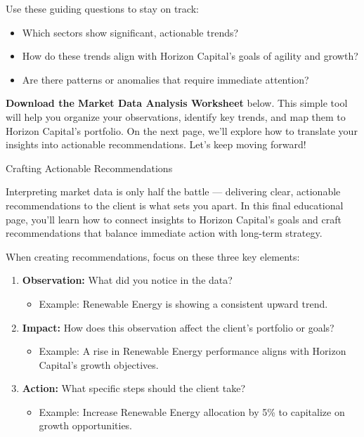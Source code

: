 \documentclass[11pt]{article}
\begin{document}
Use these guiding questions to stay on track:
\begin{itemize}[leftmargin=1.5em, itemsep=2pt]
  \item Which sectors show significant, actionable trends?
  \item How do these trends align with Horizon Capital's goals of agility and
  growth?
  \item Are there patterns or anomalies that require immediate attention?
\end{itemize}


\textbf{Download the Market Data Analysis Worksheet} below. This simple tool
will help you organize your observations, identify key trends, and map them to
Horizon Capital's portfolio. On the next page, we'll explore how to translate
your insights into actionable recommendations. Let's keep moving forward!\par\medskip


\newpage
{\fontsize{26}{30}\selectfont Crafting Actionable Recommendations}\par\bigskip

Interpreting market data is only half the battle --- delivering clear,
actionable recommendations to the client is what sets you apart. In this final
educational page, you'll learn how to connect insights to Horizon Capital's
goals and craft recommendations that balance immediate action with long-term
strategy.

When creating recommendations, focus on these three key elements:
\begin{enumerate}[leftmargin=1.5em, itemsep=3pt]
  \item \textbf{Observation:} What did you notice in the data?
  \begin{itemize}[itemsep=1pt]
    \item Example: Renewable Energy is showing a consistent upward trend.
  \end{itemize}
  \item \textbf{Impact:} How does this observation affect the client's
  portfolio or goals?
  \begin{itemize}[itemsep=1pt]
    \item Example: A rise in Renewable Energy performance aligns with Horizon
    Capital's growth objectives.
  \end{itemize}
  \item \textbf{Action:} What specific steps should the client take?
  \begin{itemize}[itemsep=1pt]
    \item Example: Increase Renewable Energy allocation by 5\% to capitalize
    on growth opportunities.
  \end{itemize}
\end{enumerate}
\end{document}
